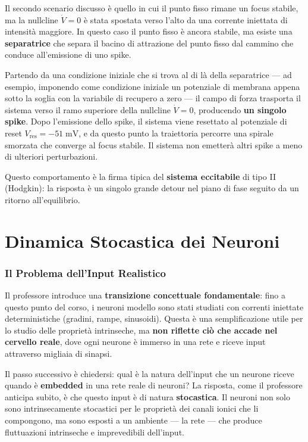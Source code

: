 Il secondo scenario discusso è quello in cui il punto fisso rimane un focus stabile, ma la nullcline $\dot{V} = 0$ è stata spostata verso l'alto da una corrente iniettata di intensità maggiore. In questo caso il punto fisso è ancora stabile, ma esiste una \textbf{separatrice} che separa il bacino di attrazione del punto fisso dal cammino che conduce all'emissione di uno spike.

Partendo da una condizione iniziale che si trova al di là della separatrice — ad esempio, imponendo come condizione iniziale un potenziale di membrana appena sotto la soglia con la variabile di recupero a zero — il campo di forza trasporta il sistema verso il ramo superiore della nullcline $\dot{V} = 0$, producendo \textbf{un singolo spike}. Dopo l'emissione dello spike, il sistema viene resettato al potenziale di reset $V_{\text{res}} = -51 \; \text{mV}$, e da questo punto la traiettoria percorre una spirale smorzata che converge al focus stabile. Il sistema non emetterà altri spike a meno di ulteriori perturbazioni.

Questo comportamento è la firma tipica del \textbf{sistema eccitabile} di tipo II (Hodgkin): la risposta è un singolo grande detour nel piano di fase seguito da un ritorno all'equilibrio.

\newpage

\section{Dinamica Stocastica dei Neuroni}

\subsubsection{Il Problema dell'Input Realistico}

Il professore introduce una \textbf{transizione concettuale fondamentale}: fino a questo punto del corso, i neuroni modello sono stati studiati con correnti iniettate deterministiche (gradini, rampe, sinusoidi). Questa è una semplificazione utile per lo studio delle proprietà intrinseche, ma \textbf{non riflette ciò che accade nel cervello reale}, dove ogni neurone è immerso in una rete e riceve input attraverso migliaia di sinapsi.

Il passo successivo è chiedersi: qual è la natura dell'input che un neurone riceve quando è \textbf{embedded} in una rete reale di neuroni? La risposta, come il professore anticipa subito, è che questo input è di natura \textbf{stocastica}. Il neuroni non solo sono intrinsecamente stocastici per le proprietà dei canali ionici che li compongono, ma sono esposti a un ambiente — la rete — che produce fluttuazioni intrinseche e imprevedibili dell'input.



